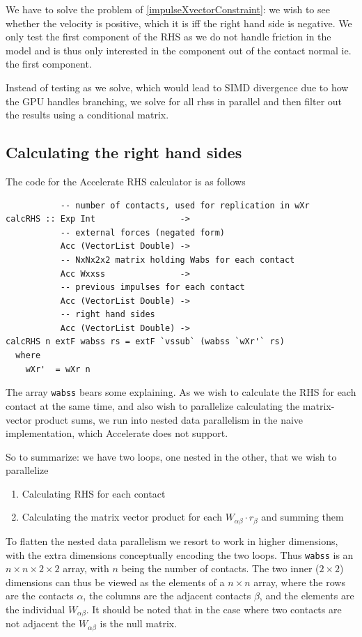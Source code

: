 \documentclass[runningheads,a4paper]{llncs}
\begin{document}
We have to solve the problem of \eqref{impulseXvectorConstraint}:
we wish to see whether the velocity is positive,
which it is iff the right hand side is negative.
We only test the first component of the RHS
as we do not handle friction in the model and is thus only interested
in the component out of the contact normal ie. the first component.

Instead of testing as we solve,
which would lead to SIMD divergence due to how the GPU handles branching,
we solve for all rhss in parallel and then filter out the results
using a conditional matrix.

\subsection{Calculating the right hand sides}
The code for the Accelerate RHS calculator is as follows
\begin{verbatim}
           -- number of contacts, used for replication in wXr
calcRHS :: Exp Int                 ->
           -- external forces (negated form)
           Acc (VectorList Double) ->
           -- NxNx2x2 matrix holding Wabs for each contact
           Acc Wxxss               ->
           -- previous impulses for each contact
           Acc (VectorList Double) ->
           -- right hand sides
           Acc (VectorList Double) ->
calcRHS n extF wabss rs = extF `vssub` (wabss `wXr'` rs)
  where
    wXr'  = wXr n
\end{verbatim}

The array \texttt{wabss} bears some explaining.
As we wish to calculate the RHS for each contact at the same time,
and also wish to parallelize calculating the matrix-vector product sums,
we run into nested data parallelism in the naive implementation,
which Accelerate does not support.

So to summarize: we have two loops, one nested in the other, that we wish to parallelize
\begin{enumerate}
\item Calculating RHS for each contact
\item Calculating the matrix vector product for each $W_{\alpha\beta} \cdot r_{\beta}$ and summing them
\end{enumerate}

To flatten the nested data parallelism we resort to work in higher dimensions,
with the extra dimensions conceptually encoding the two loops.
Thus \texttt{wabss} is an $n \times n \times 2 \times 2$ array,
with $n$ being the number of contacts.
The two inner ($2 \times 2$) dimensions can thus be viewed
as the elements of a $n \times n$ array,
where the rows are the contacts $\alpha$,
the columns are the adjacent contacts $\beta$,
and the elements are the individual $W_{\alpha\beta}$.
It should be noted that in the case where two contacts are not adjacent
the $W_{\alpha\beta}$ is the null matrix.
\end{document}
